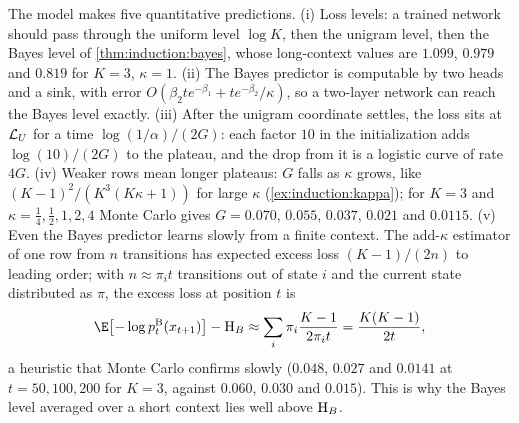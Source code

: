 \begin{refsection}
The model makes five quantitative predictions. (i) Loss levels: a trained network should pass through the uniform level $\log K$, then the unigram level, then the Bayes level of \cref{thm:induction:bayes}, whose long-context values are $1.099$, $0.979$ and $0.819$ for $K=3$, $\kappa=1$. (ii) The Bayes predictor is computable by two heads and a sink, with error $O(\beta_2te^{-\beta_1}+te^{-\beta_2}/\kappa)$, so a two-layer network can reach the Bayes level exactly. (iii) After the unigram coordinate settles, the loss sits at $\mathcal{L}_{U}$ for a time $\log(1/\alpha)/(2G)$: each factor $10$ in the initialization adds $\log(10)/(2G)$ to the plateau, and the drop from it is a logistic curve of rate $4G$. (iv) Weaker rows mean longer plateaus: $G$ falls as $\kappa$ grows, like $(K-1)^2/(K^3(K\kappa+1))$ for large $\kappa$ (\cref{ex:induction:kappa}); for $K=3$ and $\kappa=\frac14,\frac12,1,2,4$ Monte Carlo gives $G=0.070$, $0.055$, $0.037$, $0.021$ and $0.0115$. (v) Even the Bayes predictor learns slowly from a finite context. The add-$\kappa$ estimator of one row from $n$ transitions has expected excess loss $(K-1)/(2n)$ to leading order; with $n\approx\pi_it$ transitions out of state $i$ and the current state distributed as $\pi$, the excess loss at position $t$ is
\begin{equation}\label{eq:induction:excess}
  \E\bigl[-\log\indpb_t(x_{t+1})\bigr]-\indH_B\approx\sum_i\pi_i\frac{K-1}{2\pi_it}=\frac{K(K-1)}{2t},
\end{equation}
a heuristic that Monte Carlo confirms slowly ($0.048$, $0.027$ and $0.0141$ at $t=50,100,200$ for $K=3$, against $0.060$, $0.030$ and $0.015$). This is why the Bayes level averaged over a short context lies well above $\mathrm{H}_B$.


\end{refsection}
